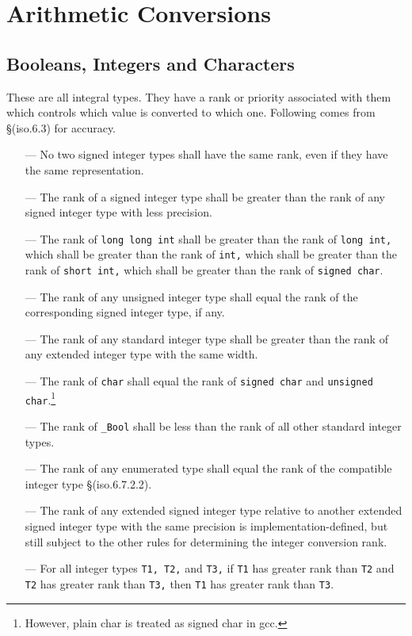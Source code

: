 \section{Arithmetic Conversions}

\subsection{Booleans, Integers and Characters}
These are all integral types. They have a rank or priority associated with them
which controls which value is converted to which one. Following comes from
\S(iso.6.3) for accuracy.

\begin{itemize}
\item[---] No two signed integer types shall have the same rank, even if they
  have the same representation.
\item[---] The rank of a signed integer type shall be greater than the rank of
  any signed integer type with less precision.
\item[---] The rank of \texttt{long long int} shall be greater than the rank of
  \texttt{long int,} which shall be greater than the rank of \texttt{int,}
  which shall be greater than the rank of \texttt{short int,} which shall be
  greater than the rank of \texttt{signed char}.
\item[---] The rank of any unsigned integer type shall equal the rank of the
  corresponding signed integer type, if any.
\item[---] The rank of any standard integer type shall be greater than the rank
  of any extended integer type with the same width.
\item[---] The rank of \texttt{char} shall equal the rank of \texttt{signed
    char} and \texttt{unsigned char}.\footnote{However, plain char is treated
    as signed char in gcc.}
\item[---] The rank of \texttt{\_Bool} shall be less than the rank of all other
  standard integer types. 
\item[---] The rank of any enumerated type shall equal the rank of the
  compatible integer type \S(iso.6.7.2.2).
\item[---]The rank of any extended signed integer type relative to another
  extended signed integer type with the same precision is
  implementation-defined, but still subject to the other rules for determining
  the integer conversion rank.
\item[---] For all integer types \texttt{T1, T2,} and \texttt{T3,} if
  \texttt{T1} has greater rank than \texttt{T2} and \texttt{T2} has greater
  rank than \texttt{T3,} then \texttt{T1} has greater rank than \texttt{T3}.
\end{itemize}

